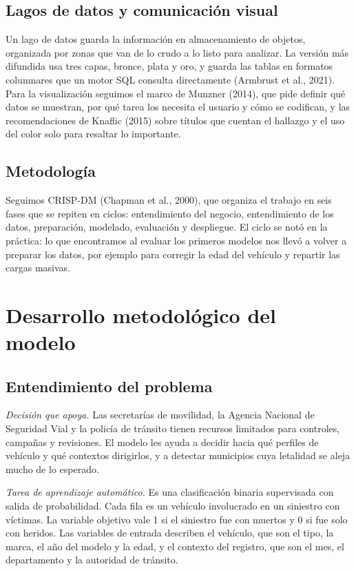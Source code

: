 \documentclass[11pt,a4paper]{article}
\begin{document}
\subsection{Lagos de datos y comunicación visual}

Un lago de datos guarda la información en almacenamiento de objetos, organizada por zonas que van de lo crudo a lo listo para analizar. La versión más difundida usa tres capas, bronce, plata y oro, y guarda las tablas en formatos columnares que un motor SQL consulta directamente (Armbrust et al., 2021). Para la visualización seguimos el marco de Munzner (2014), que pide definir qué datos se muestran, por qué tarea los necesita el usuario y cómo se codifican, y las recomendaciones de Knaflic (2015) sobre títulos que cuentan el hallazgo y el uso del color solo para resaltar lo importante.

\subsection{Metodología}

Seguimos CRISP-DM (Chapman et al., 2000), que organiza el trabajo en seis fases que se repiten en ciclos: entendimiento del negocio, entendimiento de los datos, preparación, modelado, evaluación y despliegue. El ciclo se notó en la práctica: lo que encontramos al evaluar los primeros modelos nos llevó a volver a preparar los datos, por ejemplo para corregir la edad del vehículo y repartir las cargas masivas.

\section{Desarrollo metodológico del modelo}\label{sec:metodo}

\subsection{Entendimiento del problema}

\textit{Decisión que apoya.} Las secretarías de movilidad, la Agencia Nacional de Seguridad Vial y la policía de tránsito tienen recursos limitados para controles, campañas y revisiones. El modelo les ayuda a decidir hacia qué perfiles de vehículo y qué contextos dirigirlos, y a detectar municipios cuya letalidad se aleja mucho de lo esperado.

\textit{Tarea de aprendizaje automático.} Es una clasificación binaria supervisada con salida de probabilidad. Cada fila es un vehículo involucrado en un siniestro con víctimas. La variable objetivo vale 1 si el siniestro fue con muertos y 0 si fue solo con heridos. Las variables de entrada describen el vehículo, que son el tipo, la marca, el año del modelo y la edad, y el contexto del registro, que son el mes, el departamento y la autoridad de tránsito.
\end{document}
